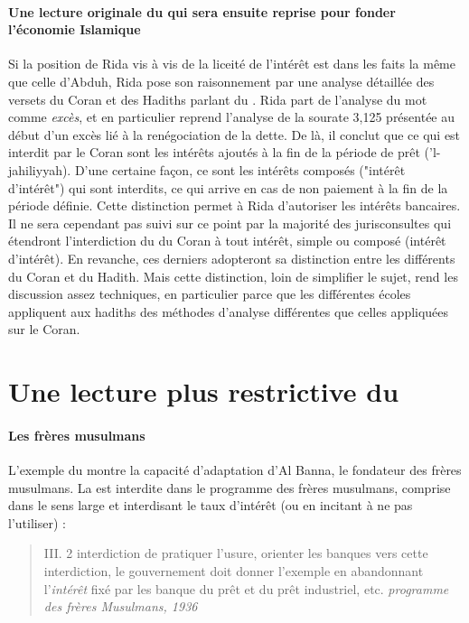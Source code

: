\paragraph{Une lecture originale du \riba  qui sera ensuite reprise pour fonder l'économie Islamique } Si la position de Rida vis à vis de la liceité de l'intérêt est dans les faits la même que celle d'Abduh, Rida pose son raisonnement par une analyse détaillée des versets du Coran et des Hadiths parlant du \riba  {}. 
Rida part de l'analyse du mot \riba comme \textit{excès}, et en particulier reprend l'analyse de la sourate 3,125 présentée au début d'un excès lié à la renégociation de la dette. De là, il conclut que ce qui est interdit par le Coran sont les intérêts ajoutés à la fin de la période de prêt (\riba ’l-jahiliyyah). D'une certaine façon, ce sont les intérêts composés ("intérêt d'intérêt") qui sont interdits, ce qui arrive en cas de non paiement à la fin de la période définie. Cette distinction permet à Rida d'autoriser les intérêts bancaires. Il ne sera cependant pas suivi sur ce point par la majorité des jurisconsultes qui étendront l'interdiction du \riba du Coran à tout intérêt, simple ou composé (intérêt d'intérêt). En revanche, ces derniers adopteront sa distinction entre les différents \riba du Coran et du Hadith. Mais cette distinction, loin de simplifier le sujet, rend les discussion assez techniques, en particulier parce que les différentes écoles appliquent aux hadiths des méthodes d'analyse différentes que celles appliquées sur le Coran. 
 

 \section{Une lecture plus restrictive du \riba}
\paragraph{Les frères musulmans} L'exemple du \riba montre la capacité d'adaptation d'Al Banna, le fondateur des frères musulmans.
La \riba est interdite dans le programme des frères musulmans, comprise dans le sens large et interdisant le taux d'intérêt (ou en incitant à ne pas l'utiliser) : 
\begin{quote}
    III. 2 interdiction de pratiquer l'usure, orienter les banques vers cette interdiction, le gouvernement doit donner l'exemple en abandonnant l'\textit{intérêt} fixé par les banque du prêt et du prêt industriel, etc. \textit{programme des frères Musulmans, 1936}
\end{quote}

